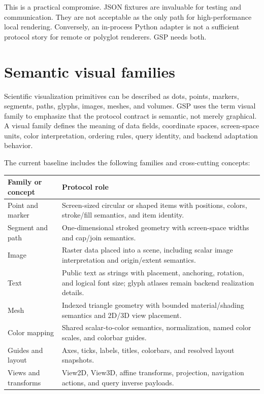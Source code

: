 \documentclass[a4paper,11pt]{article}
\newcommand{\gsp}{GSP\xspace}
\begin{document}
This is a practical compromise. JSON fixtures are invaluable for testing and communication. They
are not acceptable as the only path for high-performance local rendering. Conversely, an in-process
Python adapter is not a sufficient protocol story for remote or polyglot renderers. \gsp needs both.

\section{Semantic visual families}

Scientific visualization primitives can be described as dots, points, markers, segments, paths,
glyphs, images, meshes, and volumes. \gsp uses the term visual family to emphasize that the
protocol contract is semantic, not merely graphical. A visual family defines the meaning of data
fields, coordinate spaces, screen-space units, color interpretation, ordering rules, query
identity, and backend adaptation behavior.

The current baseline includes the following families and cross-cutting concepts:

\begin{center}
\begin{tabularx}{0.95\textwidth}{@{}lX@{}}
\toprule
Family or concept & Protocol role \\
\midrule
Point and marker & Screen-sized circular or shaped items with positions, colors, stroke/fill
semantics, and item identity. \\
Segment and path & One-dimensional stroked geometry with screen-space widths and cap/join
semantics. \\
Image & Raster data placed into a scene, including scalar image interpretation and origin/extent
semantics. \\
Text & Public text as strings with placement, anchoring, rotation, and logical font size; glyph
atlases remain backend realization details. \\
Mesh & Indexed triangle geometry with bounded material/shading semantics and 2D/3D view
placement. \\
Color mapping & Shared scalar-to-color semantics, normalization, named color scales, and
colorbar guides. \\
Guides and layout & Axes, ticks, labels, titles, colorbars, and resolved layout snapshots. \\
Views and transforms & View2D, View3D, affine transforms, projection, navigation actions, and
query inverse payloads. \\
\bottomrule
\end{tabularx}
\end{center}
\end{document}
